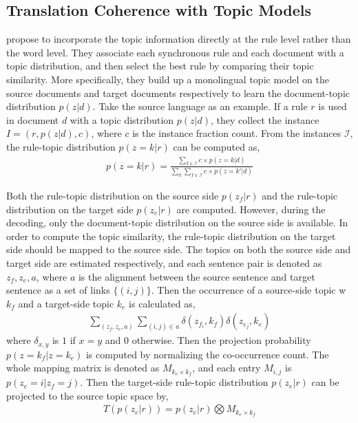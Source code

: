 


\subsection{Translation Coherence with Topic Models}

\citet{xiao-12} propose to incorporate the topic information directly at the rule level rather than the word level. They associate each synchronous rule and each document with a topic distribution, and then select the best rule by comparing their topic similarity. More specifically, they build up a monolingual topic model on the source documents and target documents respectively to learn the document-topic distribution $p(z|d)$. Take the source language as an example. If a rule $r$ is used in document $d$ with a topic distribution $p(z|d)$, they collect the instance $I=(r, p(z|d), c)$, where $c$ is the instance fraction count. From the instances $\mathcal{I}$, the rule-topic distribution $p(z=k|r)$ can be computed as,
\begin{align}
p(z=k|r) = \frac{\sum_{I \in \mathcal{I}} c \times p(z=k|d)}{\sum_k \sum_{I \in \mathcal{I}} c \times p(z=k'|d)}
\end{align}

Both the rule-topic distribution on the source side $p(z_f|r)$ and the rule-topic distribution on the target side $p(z_e|r)$ are computed. However, during the decoding, only the document-topic distribution on the source side is available. In order to compute the topic similarity, the rule-topic distribution on the target side should be mapped to the source side. The topics on both the source side and target side are estimated respectively,  and each sentence pair is denoted as $z_f, z_e, a$, where $a$ is the alignment between the source sentence and target sentence as a set of links $\{(i,j)\}$. Then the occurrence of a source-side topic w$k_f$ and a target-side topic $k_e$ is calculated as,
\begin{align}
\sum_{(z_f,z_e,a)} \sum_{(i,j) \in a} \delta(z_{f_i}, k_f) \delta(z_{e_j}, k_e)
\end{align}
where $\delta_{x,y}$ is $1$ if $x=y$ and $0$ otherwise. Then the projection probability $p(z=k_f | z=k_e)$ is computed by normalizing the co-occurrence count. The whole mapping matrix is denoted as $M_{k_e \times k_f}$, and each entry $M_{i,j}$ is $p(z_e=i | z_f=j)$. Then the target-side rule-topic distribution $p(z_e|r)$ can be projected to the source topic space by,
\begin{align}
T(p(z_e|r)) = p(z_e|r) \bigotimes M_{k_e \times k_f}
\end{align}

